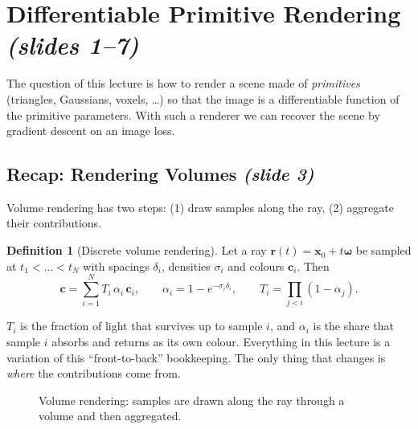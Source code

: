 \documentclass[11pt,a4paper]{article}
\newcommand{\sr}[1]{\texorpdfstring{\emph{(#1)}}{(#1)}}
\theoremstyle{definition}
\newtheorem{definition}{Definition}[section]
\theoremstyle{algstyle}
\theoremstyle{plain}
\theoremstyle{remark}
\newcommand{\eye}[2]{\begin{scope}[shift={(#1,#2)}]
  \draw[thick,fill=white] (0,0) to[bend left=45] (0.7,0) to[bend left=45] (0,0);
  \fill[blue!45] (0.35,0) circle (0.09);\end{scope}}
\begin{document}
\section{Differentiable Primitive Rendering \sr{slides 1--7}}
The question of this lecture is how to render a scene made of \emph{primitives} (triangles, Gaussians, voxels, \dots) so that the image is a differentiable function of the primitive parameters. With such a renderer we can recover the scene by gradient descent on an image loss.

\subsection{Recap: Rendering Volumes \sr{slide 3}}
Volume rendering has two steps: (1) draw samples along the ray, (2) aggregate their contributions.

\begin{definition}[Discrete volume rendering]
Let a ray $\bm r(t)=\bm x_0+t\bm\omega$ be sampled at $t_1<\dots<t_N$ with spacings $\delta_i$, densities $\sigma_i$ and colours $\bm c_i$. Then
\[
\bm c=\sum_{i=1}^{N}T_i\,\alpha_i\,\bm c_i,\qquad
\alpha_i=1-e^{-\sigma_i\delta_i},\qquad
T_i=\prod_{j<i}(1-\alpha_j).
\]
\end{definition}

\begin{intuition}
$T_i$ is the fraction of light that survives up to sample $i$, and $\alpha_i$ is the share that sample $i$ absorbs and returns as its own colour. Everything in this lecture is a variation of this ``front-to-back'' bookkeeping. The only thing that changes is \emph{where} the contributions come from.
\end{intuition}

\begin{figure}[htbp]
\centering
{}
\caption{Volume rendering: samples are drawn along the ray through a volume and then aggregated.}
\end{figure}
\end{document}
